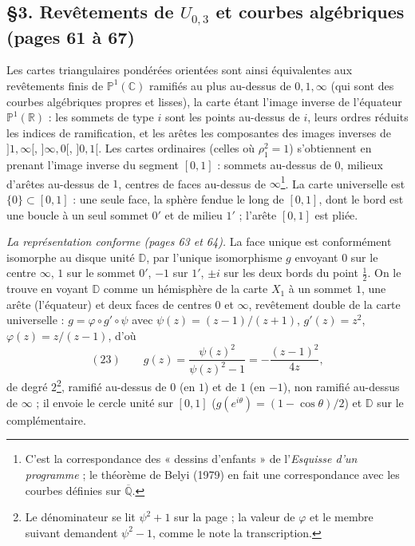 \documentclass[11pt,a4paper]{article}
\begin{document}
\subsection*{§3. Revêtements de $U_{0,3}$ et courbes algébriques (pages 61 à 67)}

Les cartes triangulaires pondérées orientées sont ainsi équivalentes aux
revêtements finis de $\mathbb{P}^1(\mathbb{C})$ ramifiés au plus au-dessus de
$0, 1, \infty$ (qui sont des courbes algébriques propres et lisses), la
carte étant l'image inverse de l'équateur $\mathbb{P}^1(\mathbb{R})$ : les
sommets de type $i$ sont les points au-dessus de $i$, leurs ordres réduits les
indices de ramification, et les arêtes les composantes des images inverses de
$]1, \infty[$, $]\infty, 0[$, $]0, 1[$. Les cartes ordinaires (celles où
$\rho_1^2 = 1$) s'obtiennent en prenant l'image inverse du segment $[0, 1]$ :
sommets au-dessus de $0$, milieux d'arêtes au-dessus de $1$, centres de faces
au-dessus de $\infty$\footnote{C'est la correspondance des « dessins d'enfants »
de l'\emph{Esquisse d'un programme} ; le théorème de Belyi (1979) en fait une
correspondance avec les courbes définies sur $\overline{\mathbb{Q}}$.}. La
carte universelle est $\{0\} \subset [0, 1]$ : une seule face, la sphère
fendue le long de $[0, 1]$, dont le bord est une boucle à un seul sommet $0'$
et de milieu $1'$ ; l'arête $[0, 1]$ est pliée.

\emph{La représentation conforme (pages 63 et 64).} La face unique est
conformément isomorphe au disque unité $\mathbb{D}$, par l'unique
isomorphisme $g$ envoyant $0$ sur le centre $\infty$, $1$ sur le sommet $0'$,
$-1$ sur $1'$, $\pm i$ sur les deux bords du point $\tfrac12$. On le trouve en
voyant $\mathbb{D}$ comme un hémisphère de la carte $X_1$ à un sommet $1$, une
arête (l'équateur) et deux faces de centres $0$ et $\infty$, revêtement double
de la carte universelle : $g = \varphi \circ g' \circ \psi$ avec
$\psi(z) = (z-1)/(z+1)$, $g'(z) = z^2$, $\varphi(z) = z/(z-1)$, d'où
\[
(23)\qquad g(z) = \frac{\psi(z)^2}{\psi(z)^2 - 1} = -\frac{(z-1)^2}{4z},
\]
de degré $2$\footnote{Le
dénominateur se lit $\psi^2 + 1$ sur la page ; la valeur de $\varphi$ et le
membre suivant demandent $\psi^2 - 1$, comme le note la transcription.}, ramifié au-dessus de $0$ (en $1$) et de $1$ (en $-1$), non
ramifié au-dessus de $\infty$ ; il envoie le cercle unité sur $[0, 1]$
($g(e^{i\theta}) = (1 - \cos\theta)/2$) et $\mathbb{D}$ sur le complémentaire.
\end{document}
